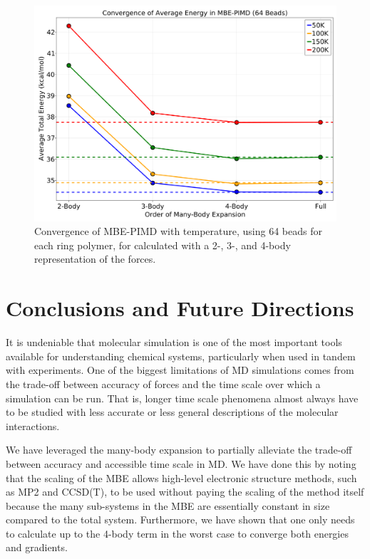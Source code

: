 \documentclass[11pt, proquest]{uwthesis}[2020/02/24]
\let\ce\ch
\begin{document}
\begin{figure}[t]
\uwsinglespace
\begin{center}
\begin{minipage}{0.9\textwidth}
\includegraphics[width=\textwidth]{Figures/Chapter_4/ch4_figure_8.png}
\end{minipage}
\end{center}
\caption[Convergence of MBE-PIMD with temperature, using 64 beads for each ring polymer, for \ce{(H2O)4} calculated with a 2-, 3-, and 4-body representation of the forces.]{Convergence of MBE-PIMD with temperature, using 64 beads for each ring polymer, for \ce{(H2O)4} calculated with a 2-, 3-, and 4-body representation of the forces.}
\label{fig:MBE_MD_F8}
\end{figure}

\chapter{Conclusions and Future Directions}

\par It is undeniable that molecular simulation is one of the most important tools available for understanding chemical systems, particularly when used in tandem with experiments. One of the biggest limitations of MD simulations comes from the trade-off between accuracy of forces and the time scale over which a simulation can be run. That is, longer time scale phenomena almost always have to be studied with less accurate or less general descriptions of the molecular interactions.

\par We have leveraged the many-body expansion to partially alleviate the trade-off between accuracy and accessible time scale in MD. We have done this by noting that the scaling of the MBE allows high-level electronic structure methods, such as MP2 and CCSD(T), to be used without paying the scaling of the method itself because the many sub-systems in the MBE are essentially constant in size compared to the total system. Furthermore, we have shown that one only needs to calculate up to the 4-body term in the worst case to converge both energies and gradients.
\end{document}
